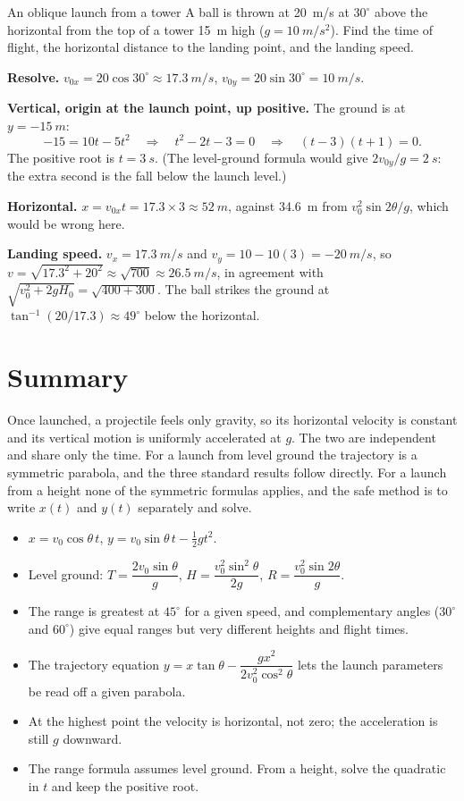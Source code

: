 \begin{exbox}{An oblique launch from a tower}
A ball is thrown at \SI{20}{m/s} at $30^\circ$ above the horizontal from the top of a tower \SI{15}{m}
high ($g=\SI{10}{m/s^2}$). Find the time of flight, the horizontal distance to the landing point, and the
landing speed.

 \textbf{Resolve.} $v_{0x}=20\cos30^\circ\approx\SI{17.3}{m/s}$, $v_{0y}=20\sin30^\circ=\SI{10}{m/s}$.

 \textbf{Vertical, origin at the launch point, up positive.} The ground is at $y=\SI{-15}{m}$:
\[
-15=10t-5t^2\quad\Longrightarrow\quad t^2-2t-3=0\quad\Longrightarrow\quad(t-3)(t+1)=0.
\]
The positive root is $t=\SI{3}{s}$. (The level-ground formula would give $2v_{0y}/g=\SI{2}{s}$: the extra
second is the fall below the launch level.)

 \textbf{Horizontal.} $x=v_{0x}t=17.3\times3\approx\SI{52}{m}$, against \SI{34.6}{m} from
$v_0^2\sin2\theta/g$, which would be wrong here.

 \textbf{Landing speed.} $v_x=\SI{17.3}{m/s}$ and $v_y=10-10(3)=\SI{-20}{m/s}$, so
$v=\sqrt{17.3^2+20^2}\approx\sqrt{700}\approx\SI{26.5}{m/s}$, in agreement with
$\sqrt{v_0^2+2gH_0}=\sqrt{400+300}$. The ball strikes the ground at $\tan^{-1}(20/17.3)\approx49^\circ$
below the horizontal.
\end{exbox}

\section{Summary}\label{sec:summary4}
Once launched, a projectile feels only gravity, so its horizontal velocity is constant and its vertical
motion is uniformly accelerated at $g$. The two are independent and share only the time. For a launch
from level ground the trajectory is a symmetric parabola, and the three standard results follow directly.
For a launch from a height none of the symmetric formulas applies, and the safe method is to write
$x(t)$ and $y(t)$ separately and solve.

\begin{itemize}
\item $x=v_0\cos\theta\,t$, \quad $y=v_0\sin\theta\,t-\tfrac12gt^2$.
\item Level ground: $T=\dfrac{2v_0\sin\theta}{g}$, \quad $H=\dfrac{v_0^2\sin^2\theta}{2g}$, \quad
      $R=\dfrac{v_0^2\sin2\theta}{g}$.
\item The range is greatest at $45^\circ$ for a given speed, and complementary angles ($30^\circ$ and $60^\circ$) give equal
      ranges but very different heights and flight times.
\item The trajectory equation $y=x\tan\theta-\dfrac{gx^2}{2v_0^2\cos^2\theta}$ lets the launch parameters be
      read off a given parabola.
\item At the highest point the velocity is horizontal, not zero; the acceleration is still $g$ downward.
\item The range formula assumes level ground. From a height, solve the quadratic in $t$ and keep the
      positive root.
\end{itemize}

